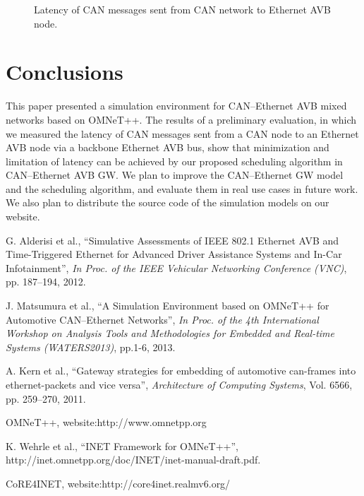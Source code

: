 \documentclass{sig-alternate}
\begin{document}
\begin{figure}
 \centering
 \caption{Latency of CAN messages sent from CAN network to Ethernet AVB node.}
 \label{results}
\end{figure}

 
\section{Conclusions}

This paper presented a simulation environment for CAN--Ethernet AVB
mixed networks based on OMNeT++. The results of a preliminary
evaluation, in which we measured the latency of CAN messages sent from a
CAN node to an Ethernet AVB node via a backbone Ethernet AVB bus, show
that minimization and limitation of latency can be achieved by our
proposed scheduling algorithm in CAN--Ethernet AVB GW. We plan to
improve the CAN--Ethernet GW model and the scheduling algorithm, and
evaluate them in real use cases in future work. We also plan to
distribute the source code of the simulation models on our website.





\begin{thebibliography}{1}


G. Alderisi et al., ``Simulative Assessments of IEEE 802.1 Ethernet AVB
	and Time-Triggered Ethernet for Advanced Driver Assistance
	Systems and In-Car Infotainment'', {\em In Proc. of the IEEE
	Vehicular Networking Conference (VNC)}, pp. 187--194, 2012.

J. Matsumura et al., ``A Simulation Environment based on OMNeT++ for Automotive
	CAN--Ethernet Networks'', {\em In Proc. of the 4th International Workshop on Analysis Tools and Methodologies for Embedded and Real-time Systems (WATERS2013)}, pp.1-6, 2013.

A. Kern et al., ``Gateway strategies for embedding of automotive can-frames into
		ethernet-packets and vice versa'', {\em Architecture of
		Computing Systems}, Vol. 6566, pp. 259--270, 2011.

OMNeT++, \newblock website:http://www.omnetpp.org

K. Wehrle et al., ``INET Framework for OMNeT++'', \newblock http://inet.omnetpp.org/doc/INET/inet-manual-draft.pdf.

CoRE4INET, \newblock website:http://core4inet.realmv6.org/

\end{thebibliography}
\end{document}
